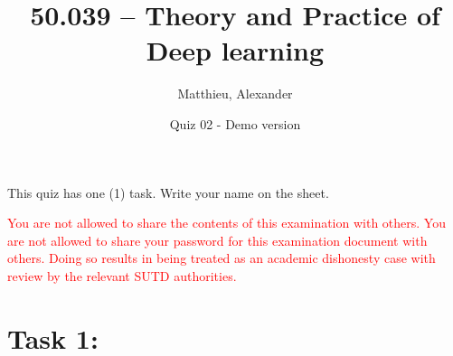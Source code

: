 \documentclass[a4paper, 11pt, addpoints, noanswers]{exam}
\title{50.039 -- Theory and Practice of Deep learning }
\author{Matthieu, Alexander}
\date{Quiz 02 - Demo version}
\newcommand{\s}{ \\\vspace{3mm} }
\begin{document}
\maketitle %
\vspace{0.5cm}





\setlength\parindent{0pt}

This quiz has one (1) task. Write your name on the sheet.\s

\textcolor{red}{You are not allowed to share the contents of this examination with others. You are not allowed to share your password for this examination document with others. Doing so results in being treated as an academic dishonesty case with review by the relevant SUTD authorities.}

\section*{Task 1:}
\end{document}
